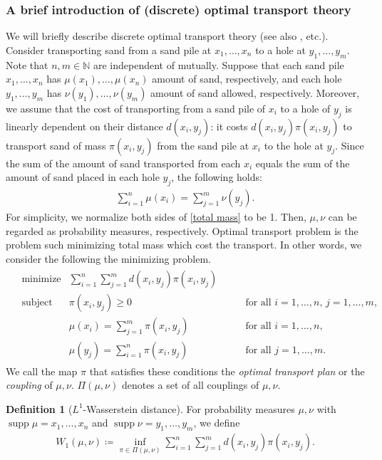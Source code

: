 \documentclass{article}
\numberwithin{equation}{section}
\theoremstyle{definition}
\newtheorem{definition}{Definition}[section]
\newcommand{\dis}{\displaystyle}
\newcommand{\N}{\mathbb{N}}
\DeclareMathOperator\supp{supp} %
\def\:={\coloneqq} %
\begin{document}
\subsubsection{A brief introduction of (discrete) optimal transport theory} \label{IntroOfOT}

We will briefly describe discrete optimal transport theory (see also \cite{FG,Sa,Vi}, etc.).
Consider transporting sand from a sand pile at $x_1,\ldots,x_n$ to a hole at $y_1,\ldots,y_m$.
Note that $n,m\in\N$ are independent {\color{red}of mutually.} 
Suppose that each sand pile $x_1,\dots,x_n$ has $\mu(x_1),\ldots,\mu(x_n)$ amount of sand, respectively, and each hole $y_1,\dots,y_m$ {\color{red} has $\nu(y_1),\dots,\nu(y_m)$ amount of sand allowed}, respectively.
Moreover, we assume that the cost of transporting from a sand pile of $x_i$ to a hole of $y_j$ is linearly dependent on their distance $d(x_i,y_j)$: 
it costs $d(x_i,y_j)\pi(x_i,y_j)$ to transport sand of mass $\pi(x_i,y_j)$ from the sand pile at $x_i$ to the hole at $y_j$.
Since the sum of the amount of sand transported from each $x_i$ equals the sum of the amount of sand placed in each hole $y_j$, the following holds:
\begin{align}
    \dis \sum_{i=1}^n \mu(x_i) = \sum_{j=1}^m \nu(y_j). \label{total mass}
\end{align}
For simplicity, we normalize both sides of \eqref{total mass} to be 1.
Then, $\mu,\nu$ can be regarded as probability measures, respectively.
Optimal transport problem is the problem such minimizing total mass which cost the transport.
In other words, we consider the following the minimizing problem.
\begin{align*}
\begin{aligned}
    & \text{minimize} 
        & \sum_{i=1}^n \sum_{j=1}^m d(x_i,y_j)\pi(x_i,y_j) & & \label{object func.} \\
    & \text{subject to} 
        & \pi(x_i,y_j)\ge 0 & \qquad \text{for all } i=1,\ldots,n,\, j=1,\ldots,m, \\
        & & \mu(x_i)=\sum_{j=1}^m \pi(x_i,y_j) & \qquad \text{for all } i=1,\ldots,n, \\
        & & \mu(y_j)=\sum_{i=1}^n \pi(x_i,y_j) & \qquad \text{for all } j=1,\ldots,m. 
\end{aligned}
\end{align*}
We call the map $\pi$ that satisfies these conditions the \emph{optimal transport plan} or the \emph{coupling} of $\mu,\nu$.
$\Pi(\mu,\nu)$ denotes a set of all couplings of $\mu,\nu$.
\begin{definition}[$L^1$-Wasserstein distance]
For probability measures $\mu,\nu$ with $\supp\mu=x_1,\ldots,x_n$ and $\supp\nu=y_1,\ldots,y_m$, we define 
\begin{align}
    W_1(\mu,\nu) \:= \inf_{\pi\in\Pi(\mu,\nu)} \sum_{i=1}^n \sum_{j=1}^m d(x_i,y_j)\pi(x_i,y_j). \label{Wasserstein}
\end{align}
\end{definition}
\end{document}
